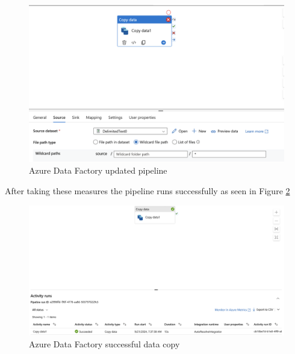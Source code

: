 \documentclass[11pt, oneside]{article}   	%
\begin{document}
\begin{figure}[H] %
   \centering
   \includegraphics[width=6in]{images/pipeline2} 
   \caption{Azure Data Factory updated pipeline}
   \label{fig:pipeline2}
\end{figure}

After taking these measures the pipeline runs successfully  as seen in Figure \ref{fig:success}
\begin{figure}[H] %
   \centering
   \includegraphics[width=6in]{images/success} 
   \caption{Azure Data Factory successful data copy}
   \label{fig:success}
\end{figure}
\end{document}
